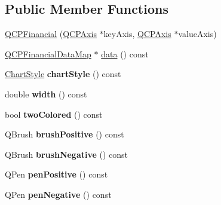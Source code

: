\subsection*{\-Public \-Member \-Functions}
\begin{DoxyCompactItemize}
\item 
\hyperlink{classQCPFinancial_a4702d5248feeb9d1ec6e3ce725b10b32}{\-Q\-C\-P\-Financial} (\hyperlink{classQCPAxis}{\-Q\-C\-P\-Axis} $\ast$key\-Axis, \hyperlink{classQCPAxis}{\-Q\-C\-P\-Axis} $\ast$value\-Axis)
\item 
\hyperlink{qcustomplot_8h_a745c09823fae0974b50beca9bc3b3d7d}{\-Q\-C\-P\-Financial\-Data\-Map} $\ast$ \hyperlink{classQCPFinancial_a58e05aefa057d16edfcc0334cf81c241}{data} () const 
\item 
\hypertarget{classQCPFinancial_a0888c9308cc5fcb4daa70184f9582412}{\hyperlink{classQCPFinancial_a0f800e21ee98d646dfc6f8f89d10ebfb}{\-Chart\-Style} {\bfseries chart\-Style} () const }\label{classQCPFinancial_a0888c9308cc5fcb4daa70184f9582412}

\item 
\hypertarget{classQCPFinancial_a71ccaa04cdade0ec08a2117db6e4a4ce}{double {\bfseries width} () const }\label{classQCPFinancial_a71ccaa04cdade0ec08a2117db6e4a4ce}

\item 
\hypertarget{classQCPFinancial_a2bab30fc4eee38a0da3a05846b8d7ac7}{bool {\bfseries two\-Colored} () const }\label{classQCPFinancial_a2bab30fc4eee38a0da3a05846b8d7ac7}

\item 
\hypertarget{classQCPFinancial_acb69536a334fae7fc31b2bfd4eca81f5}{\-Q\-Brush {\bfseries brush\-Positive} () const }\label{classQCPFinancial_acb69536a334fae7fc31b2bfd4eca81f5}

\item 
\hypertarget{classQCPFinancial_a91e09b31ce341c17b917e77fdc68d84e}{\-Q\-Brush {\bfseries brush\-Negative} () const }\label{classQCPFinancial_a91e09b31ce341c17b917e77fdc68d84e}

\item 
\hypertarget{classQCPFinancial_a544899bde79d06e17ccefcb9926d87ce}{\-Q\-Pen {\bfseries pen\-Positive} () const }\label{classQCPFinancial_a544899bde79d06e17ccefcb9926d87ce}

\item 
\hypertarget{classQCPFinancial_a557fe911aa04f70c1734c8fa09994148}{\-Q\-Pen {\bfseries pen\-Negative} () const }\label{classQCPFinancial_a557fe911aa04f70c1734c8fa09994148}


\end{DoxyCompactItemize}
